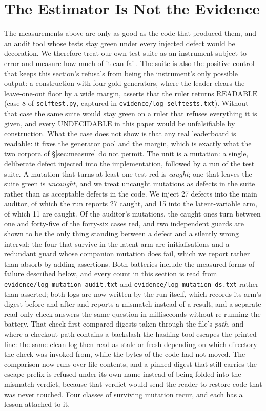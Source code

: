 \documentclass{article}
\newcommand{\ids}[1]{\texttt{\small #1}} %
\begin{document}
\section{The Estimator Is Not the Evidence}
\label{sec:nonvacuity} The measurements above are only as good as the code that produced them, and an audit tool whose tests stay green under every injected defect would be decoration. We therefore treat our own test suite as an instrument subject to error and measure how much of it can fail. The suite is also the positive control that keeps this section's refusals from being the instrument's only possible output: a construction with four gold generators, where the leader clears the leave-one-out floor by a wide margin, asserts that the ruler returns $\mathrm{READABLE}$ (case 8 of \ids{selftest.py}, captured in \ids{evidence/log\_selftests.txt}). Without that case the same suite would stay green on a ruler that refuses everything it is given, and every $\mathrm{UNDECIDABLE}$ in this paper would be unfalsifiable by construction. What the case does not show is that any real leaderboard is readable: it fixes the generator pool and the margin, which is exactly what the two corpora of \S\ref{sec:measure} do not permit. The unit is a mutation: a single, deliberate defect injected into the implementation, followed by a run of the test suite. A mutation that turns at least one test red is
\emph{caught}; one that leaves the suite green is
\emph{uncaught}, and we treat uncaught mutations as defects in the suite rather than as acceptable defects in the code. We inject 27 defects into the main auditor, of which the run reports 27 caught, and 15 into the latent-variable arm, of which 11 are caught. Of the auditor's mutations, the caught ones turn between one and forty-five of the forty-six cases red, and two independent guards are shown to be the only thing standing between a defect and a silently wrong interval; the four that survive in the latent arm are initialisations and a redundant guard whose companion mutation does fail, which we report rather than absorb by adding assertions. Both batteries include the measured forms of failure described below, and every count in this section is read from \ids{evidence/log\_mutation\_audit.txt} and \ids{evidence/log\_mutation\_ds.txt} rather than asserted; both logs are now written by the run itself, which records its arm's digest before and after and reports a mismatch instead of a result, and a separate read-only check answers the same question in milliseconds without re-running the battery. That check first compared digests taken through the file's \emph{path}, and where a checkout path contains a backslash the hashing tool escapes the printed line: the same clean log then read as stale or fresh depending on which directory the check was invoked from, while the bytes of the code had not moved. The comparison now runs over file contents, and a pinned digest that still carries the escape prefix is refused under its own name instead of being folded into the mismatch verdict, because that verdict would send the reader to restore code that was never touched. Four classes of surviving mutation recur, and each has a lesson attached to it.
\end{document}
